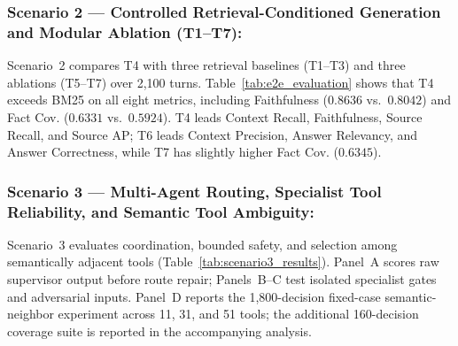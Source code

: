\subsubsection{Scenario 2 --- Controlled Retrieval-Conditioned Generation and Modular Ablation (T1--T7):}
Scenario~2 compares T4 with three retrieval baselines (T1--T3) and three ablations (T5--T7) over 2,100 turns. Table~\ref{tab:e2e_evaluation} shows that T4 exceeds BM25 on all eight metrics, including Faithfulness ($0.8636$ vs.\ $0.8042$) and Fact Cov. ($0.6331$ vs.\ $0.5924$). T4 leads Context Recall, Faithfulness, Source Recall, and Source AP; T6 leads Context Precision, Answer Relevancy, and Answer Correctness, while T7 has slightly higher Fact Cov. ($0.6345$).
\FloatBarrier

\subsubsection{Scenario 3 --- Multi-Agent Routing, Specialist Tool Reliability, and Semantic Tool Ambiguity:}
Scenario~3 evaluates coordination, bounded safety, and selection among semantically adjacent tools (Table~\ref{tab:scenario3_results}). Panel~A scores raw supervisor output before route repair; Panels~B--C test isolated specialist gates and adversarial inputs. Panel~D reports the 1,800-decision fixed-case semantic-neighbor experiment across 11, 31, and 51 tools; the additional 160-decision coverage suite is reported in the accompanying analysis.

